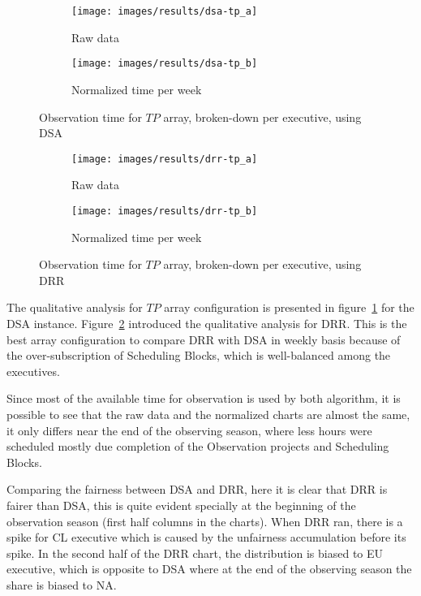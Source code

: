 \begin{figure}[t]
\centering
	\begin{subfigure}[b]{0.49\textwidth}
		\texttt{[image: images/results/dsa-tp\_a]}
        \caption{Raw data} 
    \end{subfigure} 
    \begin{subfigure}[b]{0.49\textwidth}
    		\texttt{[image: images/results/dsa-tp\_b]}
            \caption{Normalized time per week} 
    \end{subfigure}
    \caption{Observation time for $TP$ array, broken-down per executive, using DSA}
    \label{fig:dsa-tp-exec}
\end{figure}

\begin{figure}[t]
\centering
	\begin{subfigure}[b]{0.49\textwidth}
		\texttt{[image: images/results/drr-tp\_a]}
        \caption{Raw data} 
    \end{subfigure} 
    \begin{subfigure}[b]{0.49\textwidth}
    		\texttt{[image: images/results/drr-tp\_b]}
            \caption{Normalized time per week} 
    \end{subfigure}
    \caption{Observation time for $TP$ array, broken-down per executive, using DRR}
    \label{fig:drr-tp-exec}
\end{figure}

The qualitative analysis for $TP$ array configuration is presented in figure~\ref{fig:dsa-tp-exec} for the DSA instance. Figure~\ref{fig:drr-tp-exec} introduced the qualitative analysis for DRR. This is the best array configuration to compare DRR with DSA in weekly basis because of the over-subscription of Scheduling Blocks, which is well-balanced among the executives.

Since most of the available time for observation is used by both algorithm, it is possible to see that the raw data and the normalized charts are almost the same, it only differs near the end of the observing season, where less hours were scheduled mostly due completion of the Observation projects and Scheduling Blocks.

Comparing the fairness between DSA and DRR, here it is clear that DRR is fairer than DSA, this is quite evident specially at the beginning of the observation season (first half columns in the charts). When DRR ran, there is a spike for CL executive which is caused by the unfairness accumulation before its spike. In the second half of the DRR chart, the distribution is biased to EU executive, which is opposite to DSA where at the end of the observing season the share is biased to NA.

